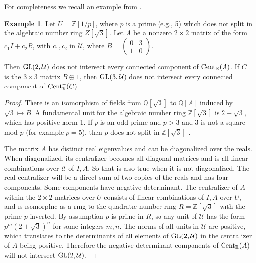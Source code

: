 \documentclass{amsart}
\theoremstyle{definition}
\newtheorem{example}[theorem]{Example}
\theoremstyle{remark}
\numberwithin{equation}{section}
\begin{document}
{{For completeness we recall an example from \cite{KR4}. 


\begin{example} \label{badcentralizer} 
Let $U=\mathbb Z[1/p]$, where $p$ is a prime 
(e.g., 5)  which does not split in the algebraic number ring 
$Z[\sqrt 3]$.
Let $A$ be a nonzero $2\times 2$ matrix of the form 
$c_1I + c_2B$, with $c_1, c_2$ in $\mathcal U$, where 
$B= \left(\begin{smallmatrix} 0 & 3 \\1 & 0
\end{smallmatrix} \right)$. 

Then $\textnormal{GL}(2,\mathcal U)$ 
does not intersect every connected component of  
$\textnormal{Cent}_{\mathbb R}(A)$.  
If $C$ is the $3\times 3 $ matrix $B\oplus 1$, then  
$\textnormal{GL}(3,\mathcal U)$ 
does not intersect every connected component of  
$\textnormal{Cent}^+_{\mathbb R}(C)$.  
\end{example} 
\begin{proof} 
There is an isomorphism of fields from $\mathbb Q[\sqrt 3]$ to 
$\mathbb Q[A]$ induced by 
$\sqrt 3 \mapsto B$. 
A fundamental unit for the algebraic number 
ring $\mathbb Z[\sqrt 3]$ is  $2+\sqrt 3$, which has positive norm 1. 
If $p$ is an odd prime and $p>3$ and $3$ is not a 
square mod $p$ (for example $p=5$), 
then  $p$ does not split in $\mathbb Z[\sqrt 3]$  
 \cite[p.74]{Ma}. 



 The
matrix $A$ has distinct real eigenvalues and can be diagonalized over the reals. When
diagonalized, its centralizer becomes all diagonal matrices and is all linear 
combinations over $\mathcal U$ 
of $I,A$. So that is also true when it is not diagonalized. The real centralizer will be a
direct sum of two copies of the reals and has four components. Some components have negative
determinant. The centralizer of $A$ 
within the $2\times 2$ matrices over $U$ consists of linear combinations of $I,A$
over $U$, and is isomorphic as a ring to the quadratic number ring $R=\mathbb Z[\sqrt 3]$ 
with the prime $p$ inverted. By assumption $p$ is prime in $R$, so any unit of 
$\mathcal U$ has the form $p^m(2+\sqrt 3)^n$ for some integers $m,n$. The norms of 
all units in $\mathcal U$ are positive, which translates to the determinants of 
all elements of $\textnormal{GL}(2,\mathcal U)$ in the centralizer of $A$ being positive. 
Therefore the negative determinant 
components of $\textnormal{Cent}_{\mathbb R}(A)$ will not intersect 
$\textnormal{GL}(2,\mathcal U)$. 


\end{proof}}}
\end{document}
